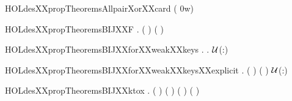 \begin{SaveVerbatim}{HOLdesXXpropTheoremsAllpairXorXXcard}
\HOLTokenTurnstile{}  ( 0w) \HOLSymConst{=}  \HOLSymConst{\HOLTokenExp{}} 
\end{SaveVerbatim}
\newcommand{\HOLdesXXpropTheoremsAllpairXorXXcard}{\UseVerbatim{HOLdesXXpropTheoremsAllpairXorXXcard}}
\begin{SaveVerbatim}{HOLdesXXpropTheoremsBIJXXF}
\HOLTokenTurnstile{} \HOLSymConst{\HOLTokenForall{}} .   \HOLTokenLeftbrace{} \HOLTokenBar{}   \HOLSymConst{\HOLTokenEor{}}  ( \HOLSymConst{\HOLTokenEor{}}  ) \HOLSymConst{=} \HOLTokenRightbrace{} (  )
\end{SaveVerbatim}
\newcommand{\HOLdesXXpropTheoremsBIJXXF}{\UseVerbatim{HOLdesXXpropTheoremsBIJXXF}}
\begin{SaveVerbatim}{HOLdesXXpropTheoremsBIJXXforXXweakXXkeys}
\HOLTokenTurnstile{} \HOLSymConst{\HOLTokenForall{}}.    \HOLSymConst{\HOLTokenImp{}} \HOLSymConst{\HOLTokenExists{}}.    \ensuremath{{\cal{U}}}(:)
\end{SaveVerbatim}
\newcommand{\HOLdesXXpropTheoremsBIJXXforXXweakXXkeys}{\UseVerbatim{HOLdesXXpropTheoremsBIJXXforXXweakXXkeys}}
\begin{SaveVerbatim}{HOLdesXXpropTheoremsBIJXXforXXweakXXkeysXXexplicit}
\HOLTokenTurnstile{} \HOLSymConst{\HOLTokenForall{}}.  \HOLSymConst{\HOLTokenLt{}}  \HOLSymConst{\HOLTokenImp{}}  (  ) (  ) \ensuremath{{\cal{U}}}(:)
\end{SaveVerbatim}
\newcommand{\HOLdesXXpropTheoremsBIJXXforXXweakXXkeysXXexplicit}{\UseVerbatim{HOLdesXXpropTheoremsBIJXXforXXweakXXkeysXXexplicit}}
\begin{SaveVerbatim}{HOLdesXXpropTheoremsBIJXXktox}
\HOLTokenTurnstile{} \HOLSymConst{\HOLTokenForall{}}  .
      ( ) \HOLTokenLeftbrace{} \HOLTokenBar{}  ( \HOLSymConst{\HOLTokenEor{}} ) \HOLSymConst{\HOLTokenEor{}}  ( \HOLSymConst{\HOLTokenEor{}}  \HOLSymConst{\HOLTokenEor{}}  ) \HOLSymConst{=} \HOLTokenRightbrace{}
       \HOLTokenLeftbrace{} \HOLTokenBar{}   \HOLSymConst{\HOLTokenEor{}}  ( \HOLSymConst{\HOLTokenEor{}}  ) \HOLSymConst{=} \HOLTokenRightbrace{}
\end{SaveVerbatim}
